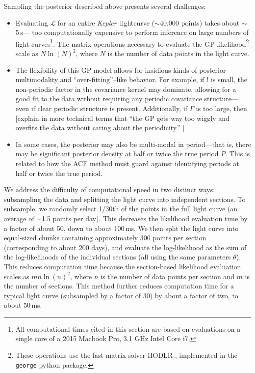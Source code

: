 \documentclass[useAMS, usenatbib, preprint, 12pt]{aastex}
\newcommand{\Kepler}{{\it Kepler}}
\begin{document}
Sampling the posterior described above presents several challenges:
\begin{itemize}
\item Evaluating $\mathcal L$ for an entire \Kepler\ lightcurve 
($\sim$40,000 points) takes about $\sim$5\,s--- too computationally expensive 
to perform inference on large numbers of light curves\footnote{All computational
times cited in this section are based on evaluations on a 
single core of a 2015 Macbook Pro, 3.1 GHz Intel Core i7.}.  The matrix operations
necessary to evaluate the GP likelihood\footnote{These operations use 
the fast matrix solver 
HODLR \citep{Ambikasaran2014}, implemented in the {\tt george} \citep{George} 
python package.} scale as $N\ln(N)^2$, where $N$ is
the number of data points in the light curve.

\item The flexibility of this GP model allows for insidious kinds of 
posterior multimodality and ``over-fitting''--like behavior.  For example, 
if $l$ is small,  the non-periodic factor in the covariance kernel may dominate, 
allowing for a good fit to the data without requiring any 
periodic covariance structure---even if
clear periodic structure is present.  Additionally, if $\Gamma$ is too large,
then [explain in more technical terms that ``the GP gets way too wiggly and
overfits the data without caring about the periodicity.'' ]

\item In some cases, the posterior may also be multi-modal in period---that is, 
there may be significant posterior density at half or twice the true period $P$.
This is related to how the ACF method must guard against identifying periods 
at half or twice the true period. 
\end{itemize}

We address the difficulty of computational speed in two distinct ways: subsampling
the data and splitting the light curve into independent sections.  
To subsample, we randomly select 1/30th of the points in the full light curve (an 
average of $\sim$1.5 points per day).  This decreases the likelihood evaluation 
time by a factor of about 50, down to about 100\,ms.
We then split the light curve into equal-sized
chunks containing approximately 300 points per section (corresponding to about
200 days), and evaluate the log-likelihood as the sum of the log-likelihoods
of the individual sections (all using the same parameters $\theta$).  This reduces
computation time because the section-based likelihood evaluation scales as $mn\ln(n)^2$, where $n$ is the number of data points per section and $m$ is the number of sections.
This method further reduces computation time for a typical light curve (subsampled
by a factor of 30) by about a factor of two, to about 50\,ms.
\end{document}
